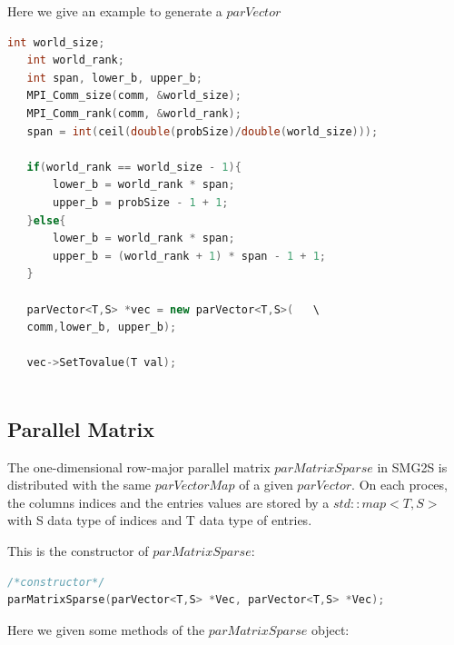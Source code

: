 \documentclass[a4paper, 10 pt]{report}
\begin{document}
	Here we give an example to generate a $parVector$
	\begin{lstlisting}[language=C++,frame=single]
   int world_size;
   int world_rank;
   int span, lower_b, upper_b;
   MPI_Comm_size(comm, &world_size);
   MPI_Comm_rank(comm, &world_rank);
   span = int(ceil(double(probSize)/double(world_size)));
   
   if(world_rank == world_size - 1){
       lower_b = world_rank * span;
       upper_b = probSize - 1 + 1;
   }else{
       lower_b = world_rank * span;
       upper_b = (world_rank + 1) * span - 1 + 1;
   }
   
   parVector<T,S> *vec = new parVector<T,S>(   \
   comm,lower_b, upper_b);
   
   vec->SetTovalue(T val);
   
	\end{lstlisting}
	
	\subsection{Parallel Matrix}
	
	The one-dimensional row-major parallel matrix $parMatrixSparse$ in SMG2S is distributed with the same $parVectorMap$ of a given $parVector$. On each proces, the columns indices and the entries values are stored by a $std::map<T, S>$ with S data type of indices and T data type of entries.
	
	This is the constructor of $parMatrixSparse$:
	
\begin{lstlisting}[language=C++,frame=single]
/*constructor*/
parMatrixSparse(parVector<T,S> *Vec, parVector<T,S> *Vec);
\end{lstlisting}
	
	Here we given some methods of the $parMatrixSparse$ object:
	
\end{document}

